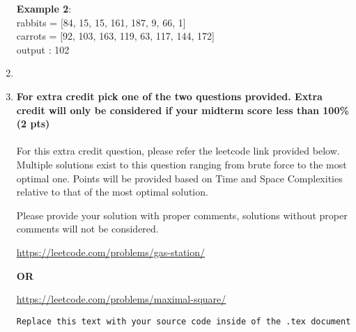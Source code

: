 \documentclass[12pt]{article}
\newcommand{\makenonemptybox}[2]{%
\item[]
\fbox{%
\parbox[c][#1][t]{\dimexpr\linewidth-2\fboxsep-2\fboxrule}{
  \hrule width \hsize height 0pt
  #2
 }%
}%
\par\vspace{\ht\strutbox}
}
\begin{document}
\begin{enumerate}
{\begin{itemize}
    \end{itemize}
    
    \textbf{Example 2}: \\
    rabbits = [84, 15, 15, 161, 187, 9, 66, 1] \\ 
    carrots = [92, 103, 163, 119, 63, 117, 144, 172] \\
    output : 102
    }
    \makenonemptybox{7.5in}{}
    
    
    \item{\textbf{For extra credit pick one of the two questions provided. Extra credit will only be considered if your midterm score less than 100\% (2 pts)} \\ \\
    For this extra credit question, please refer the leetcode link provided below. Multiple solutions exist to this question ranging from brute force to the most optimal one. Points will be provided based on Time and Space Complexities relative to that of the most optimal solution.

    Please provide your solution with proper comments, solutions without proper comments will not be considered.}
    
   \url{ https://leetcode.com/problems/gas-station/ }
   



\begin{center}
    \textbf{OR}
\end{center}   

 
  
    
   \url{  https://leetcode.com/problems/maximal-square/ }


\begin{verbatim}
Replace this text with your source code inside of the .tex document
\end{verbatim}	
    
	
\end{enumerate}
\end{document}
